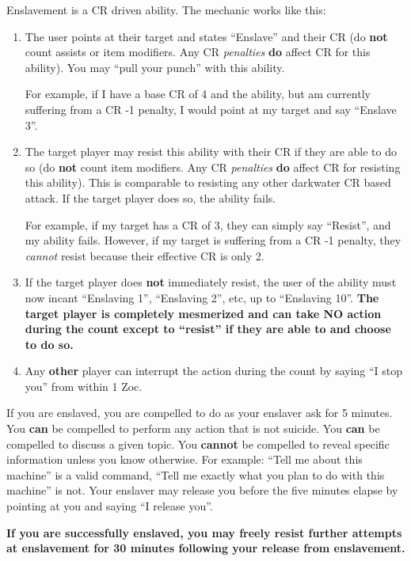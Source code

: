 \documentclass[green]{elementals}
\begin{document}
\name{\gEnslave{}} 

Enslavement is a CR driven ability. The mechanic works like this:

\begin{enumerate}
 \item The user points at their target and states ``Enslave'' and their CR (do {\bf not} count assists or item modifiers. Any CR \emph{penalties} {\bf do} affect CR for this ability). You may ``pull your punch'' with this ability. 
 
 For example, if I have a base CR of 4 and the ability, but am currently suffering from a CR -1 penalty, I would point at my target and say ``Enslave 3''. 
 
 \item The target player may resist this ability with their CR if they are able to do so (do {\bf not} count item modifiers. Any CR \emph{penalties} {\bf do} affect CR for resisting this ability). This is comparable to resisting any other darkwater CR based attack. If the target player does so, the ability fails. 
 
 For example, if my target has a CR of 3, they can simply say ``Resist'', and my ability fails.
 However, if my target is suffering from a CR -1 penalty, they \emph{cannot} resist because their effective CR is only 2.
 
 \item If the target player does {\bf not} immediately resist, the user of the ability must now incant ``Enslaving 1'', ``Enslaving 2'', etc, up to ``Enslaving 10''. {\bf The target player is completely mesmerized and can take NO action during the count except to ``resist'' if they are able to and choose to do so.}
 
 \item Any {\bf other} player can interrupt the action during the count by saying ``I stop you'' from within 1 Zoc.
\end{enumerate}

If you are enslaved, you are compelled to do as your enslaver ask for 5 minutes. You {\bf can} be compelled to perform any action that is not suicide. You {\bf can} be compelled  to discuss a given topic. You {\bf cannot} be compelled to reveal specific information unless you know otherwise. For example: ``Tell me about this machine'' is a valid command, ``Tell me exactly what you plan to do with this machine'' is not. Your enslaver may release you before the five minutes elapse by pointing at you and saying ``I release you''.

{\bf If you are successfully enslaved, you may freely resist further attempts at enslavement for 30 minutes following your release from enslavement.}
\end{document}
